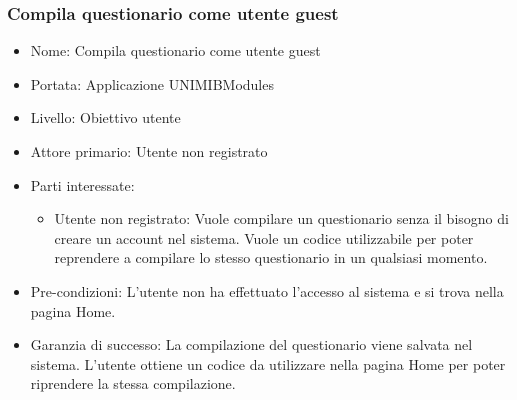 \documentclass[12pt]{article}
\begin{document}
	\subsubsection{Compila questionario come utente guest}
	\begin{itemize}
		\item Nome: Compila questionario come utente guest
	\end{itemize}
	\begin{itemize}
		\item Portata: Applicazione UNIMIBModules
	\end{itemize}
	\begin{itemize}
		\item Livello: Obiettivo utente
	\end{itemize}
	\begin{itemize}
		\item Attore primario: Utente non registrato
	\end{itemize}
	\begin{itemize}
		\item Parti interessate:
		\begin{itemize}
			\item Utente non registrato: Vuole compilare un questionario senza il bisogno di creare un account nel sistema. Vuole 
			un codice utilizzabile per poter reprendere a compilare lo stesso questionario in un qualsiasi momento.
		\end{itemize}
	\end{itemize}
	\begin{itemize}
		\item Pre-condizioni: L'utente non ha effettuato l'accesso al sistema e si trova nella pagina Home.
	\end{itemize}
	\begin{itemize}
		\item Garanzia di successo: La compilazione del questionario viene salvata nel sistema. L'utente ottiene un codice da utilizzare 
		nella pagina Home per poter riprendere la stessa compilazione.
	\end{itemize}
\end{document}
